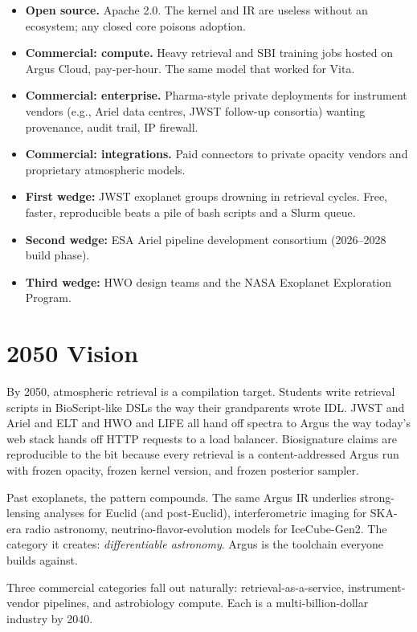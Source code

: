\documentclass[11pt,a4paper]{article}
\begin{document}
\begin{itemize}[leftmargin=1.2em]
  \item \textbf{Open source.} Apache 2.0. The kernel and IR are useless without an ecosystem; any closed core poisons adoption.
  \item \textbf{Commercial: compute.} Heavy retrieval and SBI training jobs hosted on Argus Cloud, pay-per-hour. The same model that worked for Vita.
  \item \textbf{Commercial: enterprise.} Pharma-style private deployments for instrument vendors (e.g., Ariel data centres, JWST follow-up consortia) wanting provenance, audit trail, IP firewall.
  \item \textbf{Commercial: integrations.} Paid connectors to private opacity vendors and proprietary atmospheric models.
  \item \textbf{First wedge:} JWST exoplanet groups drowning in retrieval cycles. Free, faster, reproducible beats a pile of bash scripts and a Slurm queue.
  \item \textbf{Second wedge:} ESA Ariel pipeline development consortium (2026--2028 build phase).
  \item \textbf{Third wedge:} HWO design teams and the NASA Exoplanet Exploration Program.
\end{itemize}

\section{2050 Vision}

By 2050, atmospheric retrieval is a compilation target. Students write retrieval scripts in BioScript-like DSLs the way their grandparents wrote IDL. JWST and Ariel and ELT and HWO and LIFE all hand off spectra to Argus the way today's web stack hands off HTTP requests to a load balancer. Biosignature claims are reproducible to the bit because every retrieval is a content-addressed Argus run with frozen opacity, frozen kernel version, and frozen posterior sampler.

Past exoplanets, the pattern compounds. The same Argus IR underlies strong-lensing analyses for Euclid (and post-Euclid), interferometric imaging for SKA-era radio astronomy, neutrino-flavor-evolution models for IceCube-Gen2. The category it creates: \emph{differentiable astronomy}. Argus is the toolchain everyone builds against.

Three commercial categories fall out naturally: retrieval-as-a-service, instrument-vendor pipelines, and astrobiology compute. Each is a multi-billion-dollar industry by 2040.
\end{document}
